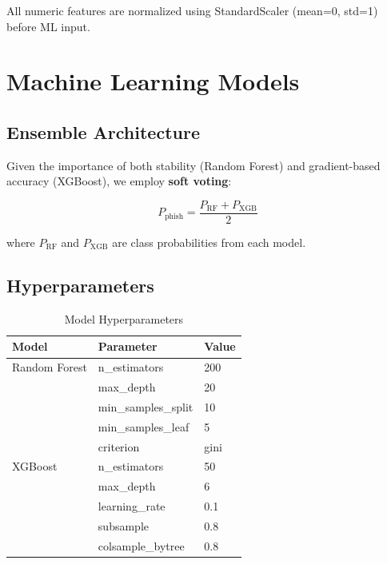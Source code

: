 \documentclass[10pt, conference]{IEEEtran}
\begin{document}
All numeric features are normalized using StandardScaler (mean=0, std=1) before ML input.

\section{Machine Learning Models}
\label{sec:ml}

\subsection{Ensemble Architecture}

Given the importance of both stability (Random Forest) and gradient-based accuracy (XGBoost), we employ \textbf{soft voting}:

\begin{equation}
    P_{\text{phish}} = \frac{P_{\text{RF}} + P_{\text{XGB}}}{2}
\end{equation}

where $P_{\text{RF}}$ and $P_{\text{XGB}}$ are class probabilities from each model.

\subsection{Hyperparameters}

\begin{table}[t]
    \centering
    \caption{Model Hyperparameters}
    \label{tab:hyperparams}
    \begin{tabular}{@{}lll@{}}
        \toprule
        Model & Parameter & Value \\
        \midrule
        Random Forest & n\_estimators & 200 \\
        & max\_depth & 20 \\
        & min\_samples\_split & 10 \\
        & min\_samples\_leaf & 5 \\
        & criterion & gini \\
        \midrule
        XGBoost & n\_estimators & 50 \\
        & max\_depth & 6 \\
        & learning\_rate & 0.1 \\
        & subsample & 0.8 \\
        & colsample\_bytree & 0.8 \\
        \bottomrule
    \end{tabular}
\end{table}
\end{document}
